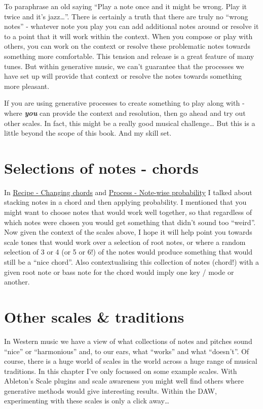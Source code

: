 \documentclass[
  12pt,
  letterpaper,
  oneside,
  open=any]{scrbook}
\begin{document}
To paraphrase an old saying ``Play a note once and it might be wrong.
Play it twice and it's jazz\ldots{}''. There is certainly a truth that
there are truly no ``wrong notes'' - whatever note you play you can add
additional notes around or resolve it to a point that it will work
within the context. When you compose or play with others, you can work
on the context or resolve these problematic notes towards something more
comfortable. This tension and release is a great feature of many tunes.
But within generative music, we can't guarantee that the processes we
have set up will provide that context or resolve the notes towards
something more pleasant.

If you are using generative processes to create something to play along
with - where \textbf{\emph{you}} can provide the context and resolution,
then go ahead and try out other scales. In fact, this might be a really
good musical challenge\ldots{} But this is a little beyond the scope of
this book. And my skill set.

\section{Selections of notes -
chords}\label{selections-of-notes---chords}

In \hyperref[001-Recipe-Changing_Chords]{Recipe - Changing chords} and
\hyperref[002-Process-Note_wise_probability]{Process - Note-wise
probability} I talked about stacking notes in a chord and then applying
probability. I mentioned that you might want to choose notes that would
work well together, so that regardless of which notes were chosen you
would get something that didn't sound too ``weird''. Now given the
context of the scales above, I hope it will help point you towards scale
tones that would work over a selection of root notes, or where a random
selection of 3 or 4 (or 5 or 6!) of the notes would produce something
that would still be a ``nice chord''. Also contextualising this
collection of notes (chord!) with a given root note or bass note for the
chord would imply one key / mode or another.

\section{Other scales \& traditions}\label{other-scales-traditions}

In Western music we have a view of what collections of notes and pitches
sound ``nice'' or ``harmonious'' and, to our ears, what ``works'' and
what ``doesn't''. Of course, there is a huge world of scales in the
world across a huge range of musical traditions. In this chapter I've
only focussed on some example scales. With Ableton's Scale plugins and
scale awareness you might well find others where generative methods
would give interesting results. Within the DAW, experimenting with these
scales is only a click away\ldots{}
\end{document}

